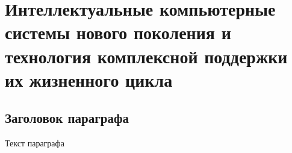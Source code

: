 
\chapter{Интеллектуальные компьютерные системы нового поколения и технология комплексной поддержки их жизненного цикла}
\label{chapter_new_generation_systems} 


\section{Заголовок параграфа}
Текст параграфа

%